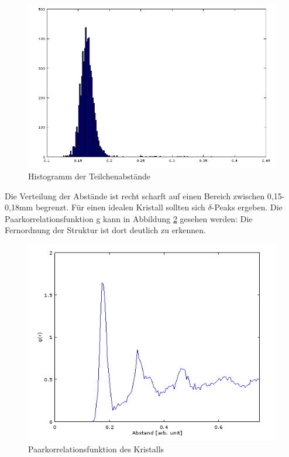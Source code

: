 \begin{figure}[ht]
    \includegraphics[width=\textwidth]{data/histogramm.PNG}
    \caption{Histogramm der Teilchenabstände}
    \label{fig:Abstand}
\end{figure}

Die Verteilung der Abstände ist recht scharft auf einen Bereich zwischen 0,15-0,18mm begrenzt. Für einen idealen Kristall sollten sich $\delta$-Peaks ergeben. Die Paarkorrelationsfunktion g kann in Abbildung \ref{fig:gr} gesehen werden: Die Fernordnung der Struktur ist dort deutlich zu erkennen.

\begin{figure}[ht]
    \includegraphics[width=\textwidth]{data/g(r).PNG}
    \caption{Paarkorrelationsfunktion des Kristalls}
    \label{fig:gr}
\end{figure}


